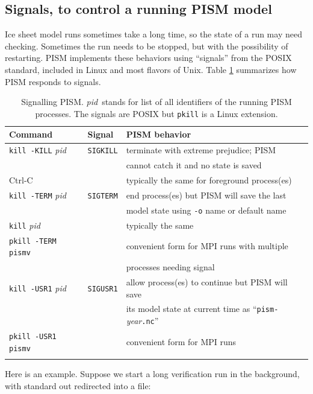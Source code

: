 \documentclass[11pt,final]{amsart}
\renewcommand{\t}[1]{\texttt{#1}}
\begin{document}
\subsection{Signals, to control a running PISM model} \label{subsect:signal}    Ice sheet model runs sometimes take a long time, so the state of a run may need checking.  Sometimes the run needs to be stopped, but with the possibility of restarting.  PISM implements these behaviors using ``signals'' from the POSIX standard, included in Linux and most flavors of Unix.  Table \ref{tab:signals} summarizes how PISM responds to signals.

\newcommand\pid{\textsl{pid}}
\newcommand\same{(\textsl{same})}
\begin{table}[ht]
\caption{Signalling PISM.  \pid~stands for list of all identifiers of the running PISM processes.  The signals are POSIX but \t{pkill} is a Linux extension.}\label{tab:signals}
\begin{tabular}{@{}llll}\hline
\textbf{Command}\phantom{bobbob} & \textbf{Signal}\phantom{bobbob} & \textbf{PISM behavior} \\ \hline
\texttt{kill -KILL} \pid & \texttt{SIGKILL} & terminate with extreme prejudice; PISM  \\
 & & cannot catch it and no state is saved \\
Ctrl-C &  & typically the same for foreground process(es)  \\ \hline
\texttt{kill -TERM} \pid & \texttt{SIGTERM} & end process(es) but PISM will save the last  \\
 &  & model state using \verb|-o| name or default name \\
\texttt{kill} \pid &  & typically the same \\
\texttt{pkill -TERM pismv} &  & convenient form for MPI runs with multiple \\ 
 &  & processes needing signal \\ \hline
\texttt{kill -USR1} \pid & \texttt{SIGUSR1} & allow process(es) to continue but PISM will save  \\
 &  & its model state at current time as ``\texttt{pism-}\textsl{year}\texttt{.nc}'' \\
\texttt{pkill -USR1 pismv} &  & convenient form for MPI runs \\
\hline\normalsize
\end{tabular}
\end{table}

Here is an example.  Suppose we start a long verification run in the background, with standard out redirected into a file:
\end{document}
